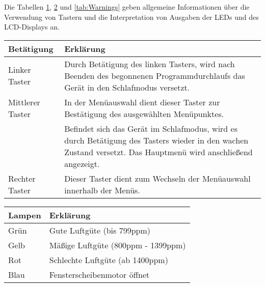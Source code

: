 \label{Handbuch}

Die Tabellen \ref{tab:Taster}, \ref{tab:Lampen} und \ref{tab:Warnings} geben allgemeine Informationen über die Verwendung von Tastern und die Interpretation von Ausgaben der LEDs und des \ac{LCD}-Displays an.

\begin{table}[!hbt]
	\centering
	\begin{tabular}{|p{4cm}|p{12cm}|}
		
		\hline
		\rowcolor{lightgray} Betätigung & Erklärung \\
		\hline
		Linker Taster & Durch Betätigung des linken Tasters, wird nach Beenden des begonnenen Programmdurchlaufs das Gerät in den Schlafmodus versetzt. \\
		\hline
		Mittlerer Taster & In der Menüauswahl dient dieser Taster zur Bestätigung des ausgewählten Menüpunktes. \\
		& Befindet sich das Gerät im Schlafmodus, wird es durch Betätigung des Tasters wieder in den wachen Zustand versetzt. Das Hauptmenü wird anschließend angezeigt. \\
		\hline
		Rechter Taster & Dieser Taster dient zum Wechseln der Menüauswahl innerhalb der Menüs. \\
		\hline
		
	\end{tabular}
	\label{tab:Taster}
\end{table}

\begin{table}[!hbt]
	\centering
	
	\begin{tabular}{|p{4cm}|p{12cm}|}
		
		\hline
		\rowcolor{lightgray} Lampen & Erklärung \\
		\hline
		Grün & Gute Luftgüte (bis 799ppm) \\
		\hline
		Gelb & Mäßige Luftgüte (800ppm - 1399ppm) \\
		\hline
		Rot & Schlechte Luftgüte (ab 1400ppm) \\
		\hline
		Blau & Fensterscheibenmotor öffnet \\
		\hline
		
	\end{tabular}
	\label{tab:Lampen}
\end{table}

\newpage

